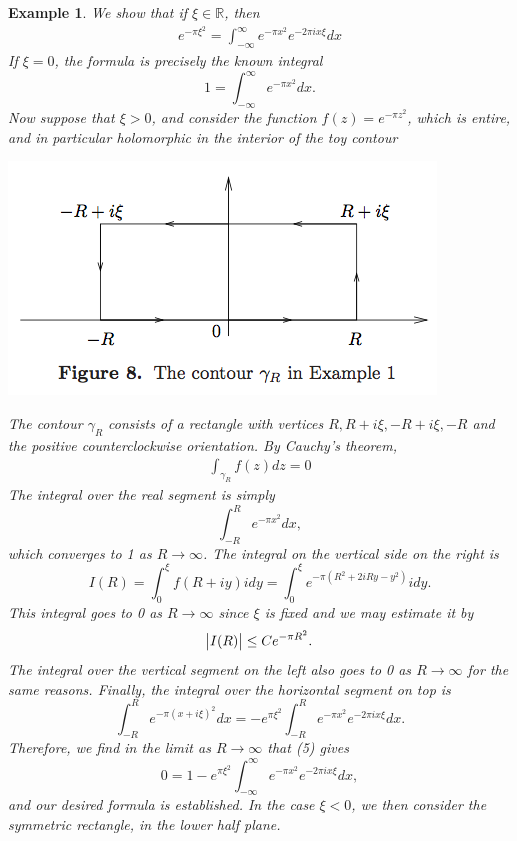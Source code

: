 \documentclass{article}
\newtheorem*{example}{Example}
\theoremstyle{definition}
\theoremstyle{remark}
\begin{document}
    \begin{example}
        We show that if $\xi\in\mathbb{R}$, then
        \begin{align}
            e^{-\pi\xi^2} = \int_{-\infty}^{\infty} e^{-\pi x^2}e^{-2\pi ix\xi}dx
        \end{align}
        If $\xi = 0$, the formula is precisely the known integral
        \[ 1 = \int_{-\infty}^{\infty} e^{-\pi x^2}dx. \]
        Now suppose that $\xi > 0$, and consider the function $f(z) = e^{-\pi z^2}$, which is entire, and in particular holomorphic
        in the interior of the toy contour
        \begin{center}
            \includegraphics[scale=0.5]{fig8.png}
        \end{center}
        The contour $\gamma_R$ consists of a rectangle with vertices $R,R+i\xi,-R+i\xi,-R$ and the positive counterclockwise
        orientation. By Cauchy's theorem,
        \begin{align}
            \int_{\gamma_R} f(z)dz = 0
        \end{align}
        The integral over the real segment is simply
        \[ \int_{-R}^R e^{-\pi x^2}dx, \]
        which converges to 1 as $R\to\infty$. The integral on the vertical side on the right is
        \[ I(R) = \int_0^{\xi} f(R+iy)idy = \int_0^{\xi} e^{-\pi(R^2+2iRy-y^2)}idy.\]
        This integral goes to 0 as $R\to\infty$ since $\xi$ is fixed and we may estimate it by
        \[ \abs{I(R)} \leq Ce^{-\pi R^2}. \]
        The integral over the vertical segment on the left also goes to 0 as $R\to\infty$ for the same reasons. Finally, the
        integral over the horizontal segment on top is
        \[ \int_{-R}^R e^{-\pi(x+i\xi)^2}dx = -e^{\pi\xi^2}\int_{-R}^R e^{-\pi x^2}e^{-2\pi ix\xi}dx.\]
        Therefore, we find in the limit as $R\to\infty$ that (5) gives
        \[ 0 = 1 - e^{\pi\xi^2}\int_{-\infty}^{\infty} e^{-\pi x^2}e^{-2\pi ix\xi}dx, \]
        and our desired formula is established. In the case $\xi < 0$, we then consider the symmetric rectangle, in the lower
        half plane.
    \end{example}
\end{document}
